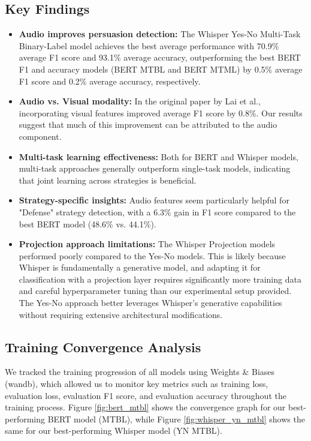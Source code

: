 \documentclass{article}
\begin{document}
\subsection{Key Findings}
\begin{itemize}
    \item \textbf{Audio improves persuasion detection:} The Whisper Yes-No Multi-Task Binary-Label model achieves the best average performance with 70.9\% average F1 score and 93.1\% average accuracy, outperforming the best BERT F1 and accuracy models (BERT MTBL and BERT MTML) by 0.5\% average F1 score and 0.2\% average accuracy, respectively.
    
    \item \textbf{Audio vs. Visual modality:} In the original paper by Lai et al., incorporating visual features improved average F1 score by 0.8\%. Our results suggest that much of this improvement can be attributed to the audio component.
    
    \item \textbf{Multi-task learning effectiveness:} Both for BERT and Whisper models, multi-task approaches generally outperform single-task models, indicating that joint learning across strategies is beneficial.
    
    \item \textbf{Strategy-specific insights:} Audio features seem particularly helpful for "Defense" strategy detection, with a 6.3\% gain in F1 score compared to the best BERT model (48.6\% vs. 44.1\%).
    
    \item \textbf{Projection approach limitations:} The Whisper Projection models performed poorly compared to the Yes-No models. This is likely because Whisper is fundamentally a generative model, and adapting it for classification with a projection layer requires significantly more training data and careful hyperparameter tuning than our experimental setup provided. The Yes-No approach better leverages Whisper's generative capabilities without requiring extensive architectural modifications.
\end{itemize}

\subsection{Training Convergence Analysis}
We tracked the training progression of all models using Weights \& Biases (wandb), which allowed us to monitor key metrics such as training loss, evaluation loss, evaluation F1 score, and evaluation accuracy throughout the training process. Figure \ref{fig:bert_mtbl} shows the convergence graph for our best-performing BERT model (MTBL), while Figure \ref{fig:whisper_yn_mtbl} shows the same for our best-performing Whisper model (YN MTBL).
\end{document}
